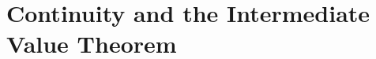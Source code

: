 \documentclass{xourse}
\begin{document}
\part{Continuity and the Intermediate Value Theorem}
\end{document}
